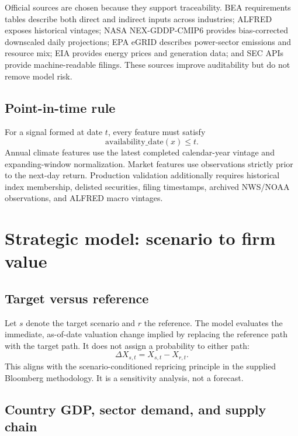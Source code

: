 \documentclass[10pt]{article}
\begin{document}
Official sources are chosen because they support traceability. BEA requirements tables describe both direct and indirect inputs across industries; ALFRED exposes historical vintages; NASA NEX-GDDP-CMIP6 provides bias-corrected downscaled daily projections; EPA eGRID describes power-sector emissions and resource mix; EIA provides energy prices and generation data; and SEC APIs provide machine-readable filings. These sources improve auditability but do not remove model risk.

\subsection{Point-in-time rule}

For a signal formed at date $t$, every feature must satisfy
\begin{equation}
\mathrm{availability\_date}(x) \le t.
\end{equation}
Annual climate features use the latest completed calendar-year vintage and expanding-window normalization. Market features use observations strictly prior to the next-day return. Production validation additionally requires historical index membership, delisted securities, filing timestamps, archived NWS/NOAA observations, and ALFRED macro vintages.

\section{Strategic model: scenario to firm value}

\subsection{Target versus reference}

Let $s$ denote the target scenario and $r$ the reference. The model evaluates the immediate, as-of-date valuation change implied by replacing the reference path with the target path. It does not assign a probability to either path:
\begin{equation}
\Delta X_{s,t}=X_{s,t}-X_{r,t}.
\end{equation}
This aligns with the scenario-conditioned repricing principle in the supplied Bloomberg methodology. It is a sensitivity analysis, not a forecast.

\subsection{Country GDP, sector demand, and supply chain}
\end{document}
